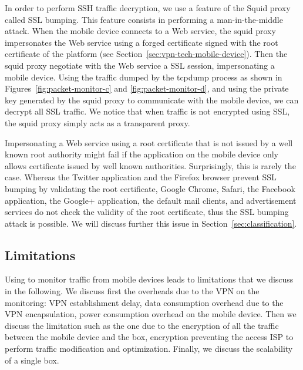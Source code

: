 In order to perform SSH traffic decryption, we use a 
feature of the Squid proxy called SSL bumping. This feature consists in performing a man-in-the-middle
attack. When the mobile device connects to a Web service, the squid
proxy impersonates the Web service using a forged certificate signed
with the root certificate of the \platname{} platform (see
Section~\ref{sec:vpn-tech-mobile-device}). Then the squid proxy
negotiate with the Web service a SSL session, impersonating a mobile
device. Using the traffic dumped by the tcpdump process as shown in
Figures~\ref{fig:packet-monitor-c} and \ref{fig:packet-monitor-d}, and
using the private key generated by the squid proxy to communicate with
the mobile device, we can decrypt all SSL traffic. We notice that when
traffic is not encrypted using SSL, the squid proxy simply acts as a
transparent proxy. 

Impersonating a Web service using a root certificate that is not
issued by a well known root authority might fail if the application on
the mobile device only allows certificate issued by well known
authorities. Surprisingly, this is rarely the case. Whereas the
Twitter application and the Firefox browser prevent SSL bumping by
validating the root certificate, Google Chrome, Safari, the Facebook
application, the Google+ application, the default mail clients, and
advertisement services do not check the validity of the root
certificate, thus the SSL bumping attack is possible. We will discuss
further this issue in Section~\ref{sec:classification}. 





\subsection{Limitations}
Using \platname{} to monitor traffic from mobile devices leads to
limitations that we discuss in the following. We discuss first the
overheads due to the VPN on the monitoring: VPN establishment delay,
data consumption overhead due to the VPN encapsulation, power
consumption overhead on the mobile device. Then we discuss the
limitation such as the one due to the encryption of all the traffic
between the mobile device and the \platname{} box, encryption
preventing the access ISP to perform traffic modification and
optimization. Finally, we discuss the scalability of a single
\platname{} box.

